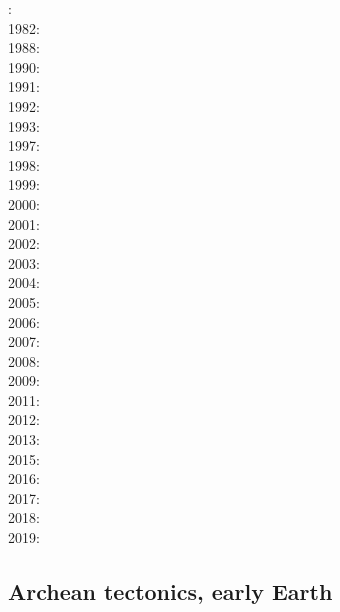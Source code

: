 {\scriptsize
{}: \cite{dixo75}\\
1982: \cite{tapl82}\\
1988: \cite{peta88}\cite{crud88}\\
1990: \cite{mccl90}\cite{jodc90}\\
1991: \cite{daco91}\\
1992: \cite{salt92}\\
1993: \cite{nabr93}\cite{shem93}\\
1997: \cite{vank97}\\
1998: \cite{bubr98}\\
1999: \cite{dava99}\cite{befo99}\cite{fagd99}\cite{nagg99}\\
2000: \cite{sche00}\cite{sobm00}\cite{chlb00}\\
2001: \cite{haki01}\cite{chys01}\\
2002: \cite{dagl02}\\
2003: \cite{smbs03}\cite{muso03}\cite{nagv03}\\
2004: \cite{sche04}\cite{sche04b}\\
2005: \cite{jujb05}\cite{sche05}\cite{sobb05}\\
2006: \cite{scbb06}\cite{tibs06}\cite{crnp06}\cite{lemm06}\cite{pabs06}\cite{malm06}\\
2007: \cite{socb07}\\
2008: \cite{clbz08}\cite{fufh08}\cite{esfm08}\\
2009: \cite{pina09}\cite{bonn09}\\
2011: \cite{dalt11}\cite{gopc11}\cite{grhd11}\\
2012: \cite{grmd12}\cite{iadc12}\\
2013: \cite{luws13}\cite{vadv13}\cite{guhf13}\cite{mibg13}\cite{mesc13}\cite{dusc13}\cite{kern13}\\
2015: \cite{casw15}\cite{rods15}\cite{kiff15}\cite{chsd15}\\
2016: \cite{scbb16}\cite{chss16}\\
2017: \cite{casw17}\\
2018: \cite{pirf18}\\
2019: \cite{mocb19}\cite{sccs19}\cite{muwm19}\cite{zwsr19}\cite{fegb19}
}

\subsection{Archean tectonics, early Earth}

